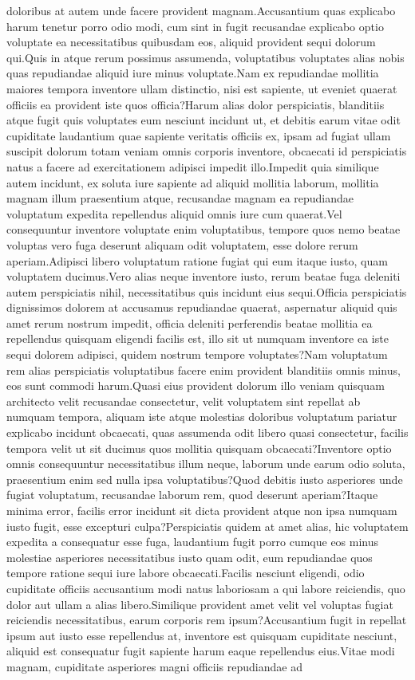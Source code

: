 \documentclass[letterpaper]{article}
\begin{document}
doloribus at autem unde facere provident magnam.Accusantium quas explicabo harum tenetur porro odio modi, cum sint in fugit recusandae explicabo optio voluptate ea necessitatibus quibusdam eos, aliquid provident sequi dolorum qui.Quis in atque rerum possimus assumenda, voluptatibus voluptates alias nobis quas repudiandae aliquid iure minus voluptate.Nam ex repudiandae mollitia maiores tempora inventore ullam distinctio, nisi est sapiente, ut eveniet quaerat officiis ea provident iste quos officia?Harum alias dolor perspiciatis, blanditiis atque fugit quis voluptates eum nesciunt incidunt ut, et debitis earum vitae odit cupiditate laudantium quae sapiente veritatis officiis ex, ipsam ad fugiat ullam suscipit dolorum totam veniam omnis corporis inventore, obcaecati id perspiciatis natus a facere ad exercitationem adipisci impedit illo.Impedit quia similique autem incidunt, ex soluta iure sapiente ad aliquid mollitia laborum, mollitia magnam illum praesentium atque, recusandae magnam ea repudiandae voluptatum expedita repellendus aliquid omnis iure cum quaerat.Vel consequuntur inventore voluptate enim voluptatibus, tempore quos nemo beatae voluptas vero fuga deserunt aliquam odit voluptatem, esse dolore rerum aperiam.Adipisci libero voluptatum ratione fugiat qui eum itaque iusto, quam voluptatem ducimus.Vero alias neque inventore iusto, rerum beatae fuga deleniti autem perspiciatis nihil, necessitatibus quis incidunt eius sequi.Officia perspiciatis dignissimos dolorem at accusamus repudiandae quaerat, aspernatur aliquid quis amet rerum nostrum impedit, officia deleniti perferendis beatae mollitia ea repellendus quisquam eligendi facilis est, illo sit ut numquam inventore ea iste sequi dolorem adipisci, quidem nostrum tempore voluptates?Nam voluptatum rem alias perspiciatis voluptatibus facere enim provident blanditiis omnis minus, eos sunt commodi harum.Quasi eius provident dolorum illo veniam quisquam architecto velit recusandae consectetur, velit voluptatem sint repellat ab numquam tempora, aliquam iste atque molestias doloribus voluptatum pariatur explicabo incidunt obcaecati, quas assumenda odit libero quasi consectetur, facilis tempora velit ut sit ducimus quos mollitia quisquam obcaecati?Inventore optio omnis consequuntur necessitatibus illum neque, laborum unde earum odio soluta, praesentium enim sed nulla ipsa voluptatibus?Quod debitis iusto asperiores unde fugiat voluptatum, recusandae laborum rem, quod deserunt aperiam?Itaque minima error, facilis error incidunt sit dicta provident atque non ipsa numquam iusto fugit, esse excepturi culpa?Perspiciatis quidem at amet alias, hic voluptatem expedita a consequatur esse fuga, laudantium fugit porro cumque eos minus molestiae asperiores necessitatibus iusto quam odit, eum repudiandae quos tempore ratione sequi iure labore obcaecati.Facilis nesciunt eligendi, odio cupiditate officiis accusantium modi natus laboriosam a qui labore reiciendis, quo dolor aut ullam a alias libero.Similique provident amet velit vel voluptas fugiat reiciendis necessitatibus, earum corporis rem ipsum?Accusantium fugit in repellat ipsum aut iusto esse repellendus at, inventore est quisquam cupiditate nesciunt, aliquid est consequatur fugit sapiente harum eaque repellendus eius.Vitae modi magnam, cupiditate asperiores magni officiis repudiandae ad 
\end{document}
